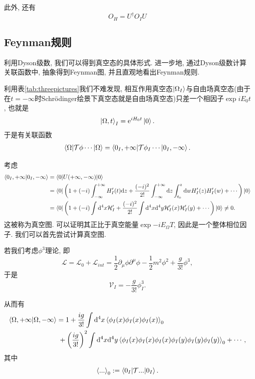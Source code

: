 此外, 还有
\begin{equation}
    O_H=U^\dagger O_I U
\end{equation}

\subsection{Feynman规则}
利用Dyson级数, 我们可以得到真空态的具体形式\cite{schwartz-dyson}. 进一步地, 通过Dyson级数计算关联函数中, 抽象得到Feynman图, 并且直观地看出Feynman规则.

利用表\ref{tab:threepictures}我们不难发现, 相互作用真空态$\ket{\Omega_I}$与自由场真空态(由于在$t=-\infty$时Schrödinger绘景下真空态就是自由场真空态)只差一个相因子$\exp{iE_0 t}$, 也就是
\begin{align}
    \ket{\Omega, t}_I=\mathrm e^{iH_0t}\ket 0.
\end{align}
于是有关联函数
\begin{align}
    \braket{\Omega|\mathcal T\phi\cdots|\Omega}=\braket{0_I, +\infty|\mathcal T\phi_I\cdots|0_I, -\infty}.
\end{align}

考虑
\begin{align}
    \braket{0_I, +\infty|0_I, -\infty}&=\braket{0|U(+\infty, -\infty)|0}\\
    &=\bra0\left(1+(-i)\int_{-\infty}^{+\infty}H'_I(t)\mathrm d z+\frac{(-i)^2}{2!}\int_{-\infty}^{+\infty}\mathrm d z\int_{t_0}^z\mathrm d w H'_I(z)H'_I(w) + \cdots\right)\ket0\\
    &=\bra0\left(1+(-i)\int\mathrm d^4x\mathcal H_I'+\frac{(-i)^2}{2!}\int\mathrm d^4x\mathrm d^4y \mathcal H_I'(x)\mathcal H_I'(y) + \cdots\right)\ket0\neq0.
\end{align}
这被称为真空图. 可以证明其正比于真空能量$\exp{-iE_\Omega T}$, 因此是一个整体相位因子. 我们可以首先尝试计算真空图.

若我们考虑$\phi^3$理论, 即
\begin{equation}
    \mathcal L=\mathcal L_0+\mathcal L_{int}=\frac12\partial_\mu\phi\partial^\mu\phi-\frac12m^2\phi^2+\frac g{3!}\phi^3,
\end{equation}
于是
\begin{equation}
    \mathcal V_I=-\frac g{3!}\phi_I^3.
\end{equation}

从而有
\begin{align}
    \braket{\Omega, +\infty|\Omega, -\infty}&=1+\frac{ig}{3!}\int\mathrm d^4x\braket{\phi_I(x)\phi_I(x)\phi_I(x)}_0\notag\\
    &\;+\left(\frac{ig}{3!}\right)^2\int\mathrm d^4x\mathrm d^4y\braket{\phi_I(x)\phi_I(x)\phi_I(x)\phi_I(y)\phi_I(y)\phi_I(y)}_0+\cdots,
\end{align}
其中
\begin{equation}
    \braket{...}_0:=\braket{0_I|\mathcal T...|0_I}.
\end{equation}

